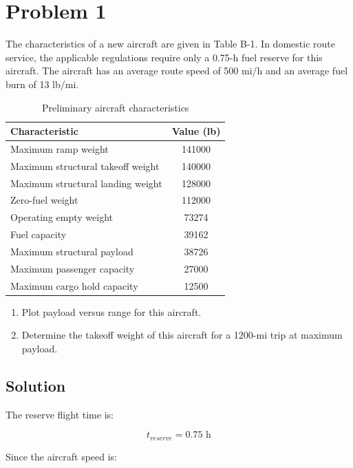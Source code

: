 \documentclass{KPS_assignment}
\begin{document}
\maketitle
\section*{Problem 1}

The characteristics of a new aircraft are given in Table B-1. In domestic route service, the applicable regulations require only a 0.75-h fuel reserve for this aircraft. The aircraft has an average route speed of 500 mi/h and an average fuel burn of 13 lb/mi.

\begin{table}[h]
\centering
\begin{tabular}{lc}
\hline
\textbf{Characteristic} & \textbf{Value (lb)} \\
\hline
Maximum ramp weight & 141000 \\
Maximum structural takeoff weight & 140000 \\
Maximum structural landing weight & 128000 \\
Zero-fuel weight & 112000 \\
Operating empty weight & 73274 \\
Fuel capacity & 39162 \\
Maximum structural payload & 38726 \\
Maximum passenger capacity & 27000 \\
Maximum cargo hold capacity & 12500 \\
\hline
\end{tabular}
\caption{Preliminary aircraft characteristics}
\end{table}

\begin{enumerate}
    \item[(a)] Plot payload versus range for this aircraft.
    \item[(b)] Determine the takeoff weight of this aircraft for a 1200-mi trip at maximum payload.
\end{enumerate}

\subsection*{Solution}

The reserve flight time is:

\[
t_{reserve} = 0.75 \text{ h}
\]

Since the aircraft speed is:
\end{document}

